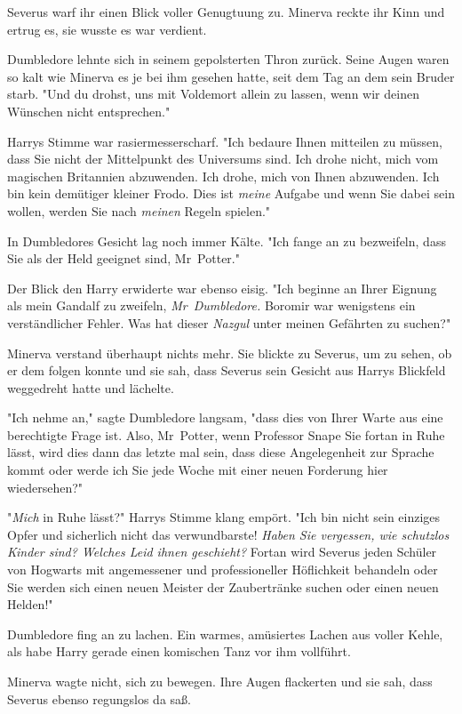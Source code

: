 {Severus warf ihr einen Blick voller Genugtuung zu. Minerva reckte ihr Kinn und ertrug es, sie wusste es war verdient.

Dumbledore lehnte sich in seinem gepolsterten Thron zurück. Seine Augen waren so kalt wie Minerva es je bei ihm gesehen hatte, seit dem Tag an dem sein Bruder starb. "Und du drohst, uns mit Voldemort allein zu lassen, wenn wir deinen Wünschen nicht entsprechen."

Harrys Stimme war rasiermesserscharf. "Ich bedaure Ihnen mitteilen zu müssen, dass Sie nicht der Mittelpunkt des Universums sind. Ich drohe nicht, mich vom magischen Britannien abzuwenden. Ich drohe, mich von Ihnen abzuwenden. Ich bin kein demütiger kleiner Frodo. Dies ist \emph{meine} Aufgabe und wenn Sie dabei sein wollen, werden Sie nach \emph{meinen} Regeln spielen."

In Dumbledores Gesicht lag noch immer Kälte. "Ich fange an zu bezweifeln, dass Sie als der Held geeignet sind, Mr~Potter."

Der Blick den Harry erwiderte war ebenso eisig. "Ich beginne an Ihrer Eignung als mein Gandalf zu zweifeln, \emph{Mr~Dumbledore.} Boromir war wenigstens ein verständlicher Fehler. Was hat dieser \emph{Nazgul} unter meinen Gefährten zu suchen?"

Minerva verstand überhaupt nichts mehr. Sie blickte zu Severus, um zu sehen, ob er dem folgen konnte und sie sah, dass Severus sein Gesicht aus Harrys Blickfeld weggedreht hatte und lächelte.

"Ich nehme an," sagte Dumbledore langsam, "dass dies von Ihrer Warte aus eine berechtigte Frage ist. Also, Mr~Potter, wenn Professor Snape Sie fortan in Ruhe lässt, wird dies dann das letzte mal sein, dass diese Angelegenheit zur Sprache kommt oder werde ich Sie jede Woche mit einer neuen Forderung hier wiedersehen?"

"\emph{Mich} in Ruhe lässt?" Harrys Stimme klang empört. "Ich bin nicht sein einziges Opfer und sicherlich nicht das verwundbarste! \emph{Haben Sie vergessen, wie schutzlos Kinder sind? Welches Leid ihnen geschieht?} Fortan wird Severus jeden Schüler von Hogwarts mit angemessener und professioneller Höflichkeit behandeln oder Sie werden sich einen neuen Meister der Zaubertränke suchen oder einen neuen Helden!"

Dumbledore fing an zu lachen. Ein warmes, amüsiertes Lachen aus voller Kehle, als habe Harry gerade einen komischen Tanz vor ihm vollführt.

Minerva wagte nicht, sich zu bewegen. Ihre Augen flackerten und sie sah, dass Severus ebenso regungslos da saß.

}
